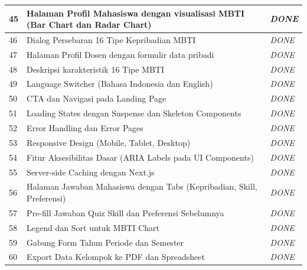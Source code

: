 \begin{longtable}{|p{}|p{}|p{}|}
	\hline
	45          & Halaman Profil Mahasiswa dengan visualisasi MBTI (Bar Chart dan Radar Chart) & \textit{DONE}        \\
	\hline
	46          & Dialog Persebaran 16 Tipe Kepribadian MBTI                                   & \textit{DONE}        \\
	\hline
	47          & Halaman Profil Dosen dengan formulir data pribadi                            & \textit{DONE}        \\
	\hline
	48          & Deskripsi karakteristik 16 Tipe MBTI                                         & \textit{DONE}        \\
	\hline
	49          & Language Switcher (Bahasa Indonesia dan English)                             & \textit{DONE}        \\
	\hline
	50          & CTA dan Navigasi pada Landing Page                                           & \textit{DONE}        \\
	\hline
	51          & Loading States dengan Suspense dan Skeleton Components                       & \textit{DONE}        \\
	\hline
	52          & Error Handling dan Error Pages                                               & \textit{DONE}        \\
	\hline
	53          & Responsive Design (Mobile, Tablet, Desktop)                                  & \textit{DONE}        \\
	\hline
	54          & Fitur Aksesibilitas Dasar (ARIA Labels pada UI Components)                   & \textit{DONE}        \\
	\hline
	55          & Server-side Caching dengan Next.js                                           & \textit{DONE}        \\
	\hline
	56          & Halaman Jawaban Mahasiswa dengan Tabs (Kepribadian, Skill, Preferensi)       & \textit{DONE}        \\
	\hline
	57          & Pre-fill Jawaban Quiz Skill dan Preferensi Sebelumnya                        & \textit{DONE}        \\
	\hline
	58          & Legend dan Sort untuk MBTI Chart                                             & \textit{DONE}        \\
	\hline
	59          & Gabung Form Tahun Periode dan Semester                                       & \textit{DONE}        \\
	\hline
	60          & Export Data Kelompok ke PDF dan Spreadsheet                                  & \textit{DONE}        \\

\end{longtable}
